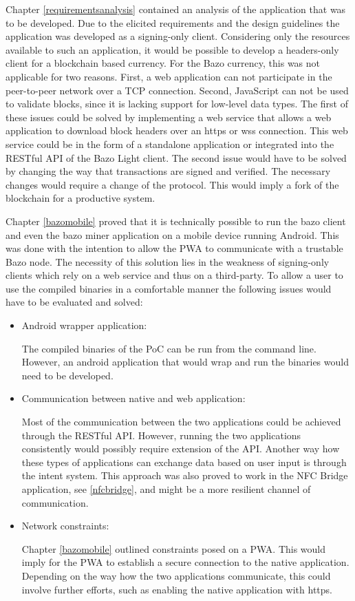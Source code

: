 Chapter \ref{requirementsanalysis} contained an analysis of the application that was to be developed. Due to the elicited requirements and the design guidelines the application was developed as a signing-only client. Considering only the resources available to such an application, it would be possible to develop a headers-only client for a blockchain based currency. For the Bazo currency, this was not applicable for two reasons. First, a web application can not participate in the peer-to-peer network over a TCP connection. Second, JavaScript can not be used to validate blocks, since it is lacking support for low-level data types. The first of these issues could be solved by implementing a web service that allows a web application to download block headers over an https or wss connection. This web service could be in the form of a standalone application or integrated into the RESTful API of the Bazo Light client. The second issue would have to be solved by changing the way that transactions are signed and verified. The necessary changes would require a change of the protocol. This would imply a fork of the blockchain for a productive system.

Chapter \ref{bazomobile} proved that it is technically possible to run the bazo client and even the bazo miner application on a mobile device running Android. This was done with the intention to allow the PWA to communicate with a trustable Bazo node. The necessity of this solution lies in the weakness of signing-only clients which rely on a web service and thus on a third-party. To allow a user to use the compiled binaries in a comfortable manner the following issues would have to be evaluated and solved:
\begin{itemize}
\item Android wrapper application:

The compiled binaries of the PoC can be run from the command line. However, an android application that would wrap and run the binaries would need to be developed.
\item Communication between native and web application:

Most of the communication between the two applications could be achieved through the RESTful API. However, running the two applications consistently would possibly require extension of the API. Another way how these types of applications can exchange data based on user input is through the intent system. This approach was also proved to work in the NFC Bridge application, see \ref{nfcbridge}, and might be a more resilient channel of communication.
\item Network constraints:

Chapter \ref{bazomobile} outlined constraints posed on a PWA. This would imply for the PWA to establish a secure connection to the native application. Depending on the way how the two applications communicate, this could involve further efforts, such as enabling the native application with https.
\end{itemize}

